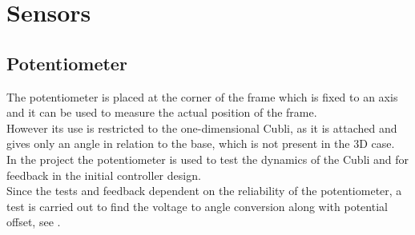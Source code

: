 \section{Sensors}
\label{sec:Sensors}

\subsection{Potentiometer}
The potentiometer is placed at the corner of the frame which is fixed to an axis and it can be used to measure the actual position of the frame.\\
However its use is restricted to the one-dimensional Cubli, as it is attached and gives only an angle in relation to the base, which is not present in the 3D case.\\
In the project the potentiometer is used to test the dynamics of the Cubli and for feedback in the initial controller design.\\
Since the tests and feedback dependent on the reliability of the potentiometer, a test is carried out to find the voltage to angle conversion along with potential offset, see .

